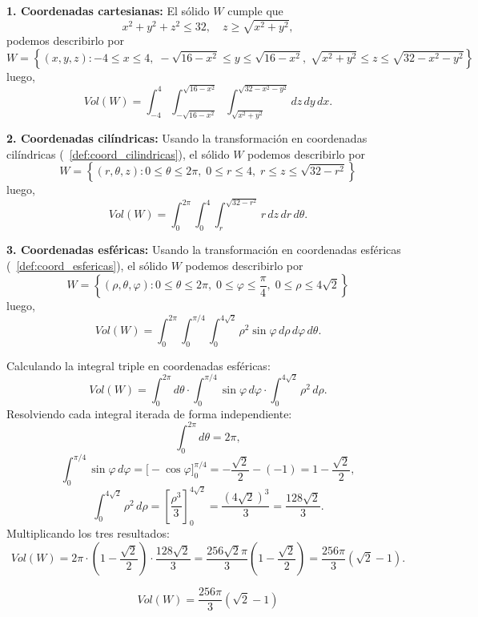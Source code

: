\textbf{1. Coordenadas cartesianas:} El s\'olido  $W$ cumple que
\[
x^2+y^2+z^2 \le 32, \quad z \ge \sqrt{x^2+y^2},
\] podemos describirlo por
\[
W=\left\{(x,y,z):
-4  \le x\le 4,\;
-\sqrt{16-x^2}\le y\le \sqrt{16-x^2},\;
\sqrt{x^2+y^2}\le z\le \sqrt{32-x^2-y^2}
\right\}
\]luego,  \[
Vol (W)=\int_{-4}^{4}
\int_{-\sqrt{16-x^2}}^{\sqrt{16-x^2}}
\int_{\sqrt{x^2+y^2}}^{\sqrt{32-x^2-y^2}}
dz\,dy\,dx.
\]

\bigskip

\textbf{2. Coordenadas cilíndricas:} Usando la transformación en coordenadas cilíndricas (~\ref{def:coord_cilindricas}), el s\'olido $W$ podemos describirlo por
\[
W=\left\{(r,\theta,z):
0 \le \theta \le 2\pi,\;
0 \le r \le 4,\;
r \le z \le \sqrt{32-r^2}
\right\}
\]luego,
\[
Vol (W)=\int_{0}^{2\pi}
\int_{0}^{4}
\int_{r}^{\sqrt{32-r^2}}
r \, dz\,dr\,d\theta.
\]

\bigskip


\textbf{3. Coordenadas esféricas:} Usando la transformación en coordenadas esféricas (~\ref{def:coord_esfericas}), el s\'olido $W$ podemos describirlo por
\[
W=\left\{(\rho,\theta,\varphi):
0 \le \theta \le 2\pi,\;
0 \le \varphi \le \frac{\pi}{4},\;
0 \le \rho \le 4\sqrt{2}
\right\}
\]luego,
\[
Vol (W)=\int_{0}^{2\pi}
\int_{0}^{\pi/4}
\int_{0}^{4\sqrt{2}}
\rho^2\sin\varphi \, d\rho\,d\varphi\,d\theta.
\]

\bigskip
Calculando la integral triple en coordenadas esféricas:
\[
Vol(W) = \int_{0}^{2\pi} d\theta \cdot \int_{0}^{\pi/4} \sin\varphi \, d\varphi \cdot \int_{0}^{4\sqrt{2}} \rho^2 \, d\rho.
\]
Resolviendo cada integral iterada de forma independiente:
\[
\int_{0}^{2\pi} d\theta = 2\pi,
\]
\[
\int_{0}^{\pi/4} \sin\varphi \, d\varphi = \Big[ -\cos\varphi \Big]_{0}^{\pi/4} = -\frac{\sqrt{2}}{2} - (-1) = 1 - \frac{\sqrt{2}}{2},
\]
\[
\int_{0}^{4\sqrt{2}} \rho^2 \, d\rho = \left[ \frac{\rho^3}{3} \right]_{0}^{4\sqrt{2}} = \frac{(4\sqrt{2})^3}{3} = \frac{128\sqrt{2}}{3}.
\]
Multiplicando los tres resultados:
\[
Vol(W) = 2\pi \cdot \left(1 - \frac{\sqrt{2}}{2}\right) \cdot \frac{128\sqrt{2}}{3} = \frac{256\sqrt{2}\pi}{3} \left(1 - \frac{\sqrt{2}}{2}\right) = \frac{256\pi}{3}(\sqrt{2}-1).
\]

\[
\boxed{Vol(W) = \frac{256\pi}{3}(\sqrt{2}-1)}
\]